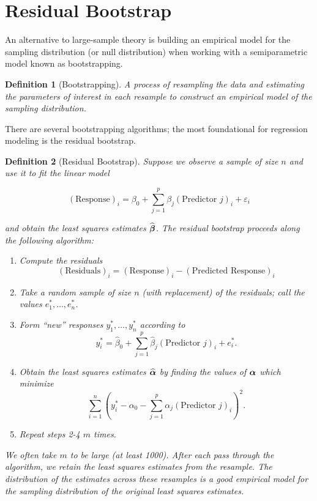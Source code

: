 \documentclass[
]{book}
\providecommand{\tightlist}{%
  \setlength{\itemsep}{0pt}\setlength{\parskip}{0pt}}
\theoremstyle{plain}
\theoremstyle{mydefn}
\newtheorem{definition}{Definition}[chapter]
\theoremstyle{myexmpl}
\theoremstyle{remark}
\begin{document}
\hypertarget{residual-bootstrap}{%
\section{Residual Bootstrap}\label{residual-bootstrap}}

An alternative to large-sample theory is building an empirical model for the sampling distribution (or null distribution) when working with a semiparametric model known as bootstrapping.

\begin{definition}[Bootstrapping]
\protect\hypertarget{def:defn-bootstrapping}{}{\label{def:defn-bootstrapping} {} }A process of resampling the data and estimating the parameters of interest in each resample to construct an empirical model of the sampling distribution.
\end{definition}

There are several bootstrapping algorithms; the most foundational for regression modeling is the residual bootstrap.

\begin{definition}[Residual Bootstrap]
\protect\hypertarget{def:defn-residual-bootstrap}{}{\label{def:defn-residual-bootstrap} {} }Suppose we observe a sample of size \(n\) and use it to fit the linear model

\[(\text{Response})_i = \beta_0 + \sum_{j=1}^{p} \beta_j (\text{Predictor } j)_i + \varepsilon_i\]

and obtain the least squares estimates \(\widehat{\boldsymbol{\beta}}\). The residual bootstrap proceeds along the following algorithm:

\begin{enumerate}
\def\labelenumi{\arabic{enumi}.}
\tightlist
\item
  Compute the residuals
  \[(\text{Residuals})_i = (\text{Response})_i - (\text{Predicted Response})_i\]
\item
  Take a random sample of size \(n\) (with replacement) of the residuals; call the values \(e_1^*, \dotsc, e_n^*\).
\item
  Form ``new'' responses \(y_1^*, \dotsc, y_n^*\) according to
  \[y_i^* = \widehat{\beta}_0 + \sum_{j=1}^{p} \widehat{\beta}_j (\text{Predictor } j)_i + e_i^*.\]
\item
  Obtain the least squares estimates \(\widehat{\boldsymbol{\alpha}}\) by finding the values of \(\boldsymbol{\alpha}\) which minimize
  \[\sum_{i=1}^{n} \left(y_i^* - \alpha_0 - \sum_{j=1}^{p} \alpha_j (\text{Predictor } j)_i\right)^2.\]
\item
  Repeat steps 2-4 \(m\) times.
\end{enumerate}

We often take \(m\) to be large (at least 1000). After each pass through the algorithm, we retain the least squares estimates from the resample. The distribution of the estimates across these resamples is a good empirical model for the sampling distribution of the original least squares estimates.
\end{definition}
\end{document}
